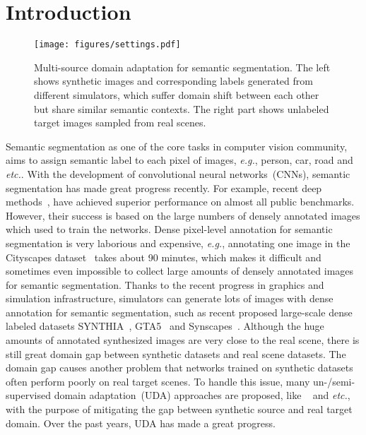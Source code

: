 \documentclass[final]{cvpr}
\def\eg{\textit{e.g.}}
\begin{document}
\section{Introduction}

\begin{figure}[t]
	\begin{center}
\texttt{[image: figures/settings.pdf]}
	\end{center}
\vspace{-6pt}
	\caption{Multi-source domain adaptation for semantic segmentation. The left shows synthetic images and corresponding labels generated from different simulators, which suffer domain shift between each other but share similar semantic contexts. The right part shows unlabeled target images sampled from real scenes.}
	\label{fig:images_comp}
	\vspace{-10pt}
\end{figure}

Semantic segmentation as one of the core tasks in computer vision community, aims to  assign semantic label to each pixel of images, \textit{e.g.}, person, car, road and \textit{etc.}. With the development of convolutional neural networks~(CNNs), semantic segmentation has made great progress recently. For example, recent deep methods~\cite{chen2018encoder,fu2019dual,he2020bdcn,Li_2020_CVPR,zhao2017pyramid}, have achieved superior performance on almost all public benchmarks. However, their success is based on the large numbers of densely annotated images which used to train the networks. Dense pixel-level annotation for semantic segmentation is very laborious and expensive, \eg, annotating one image in the Cityscapes dataset~\cite{cordts2016cityscapes} takes about 90 minutes, which makes it difficult and sometimes even impossible to collect large amounts of densely annotated images for semantic segmentation. Thanks to the recent progress in graphics and simulation infrastructure, simulators can generate lots of images with dense annotation for semantic segmentation, such as recent proposed large-scale dense labeled datasets SYNTHIA~\cite{Ros_2016_CVPR}, GTA5~\cite{Richter_2016_ECCV} and Synscapes~\cite{wrenninge2018synscapes}. Although the huge amounts of annotated synthesized images are very close to the real scene, there is still great domain gap between synthetic datasets and real scene datasets. The domain gap causes another problem that networks trained on synthetic datasets often perform poorly on real target scenes. To handle this issue, many un-/semi-supervised domain adaptation~(UDA) approaches are proposed, like ~\cite{li2019bidirectional,pan2020unsupervised,chen2021dual, takashi2021mtda,tsai2018learning,vu2019advent,FDA_Yang_2020_CVPR} and \textit{etc.}, with the purpose of mitigating the gap between synthetic source and real target domain. Over the past years, UDA has made a great progress.
\end{document}
